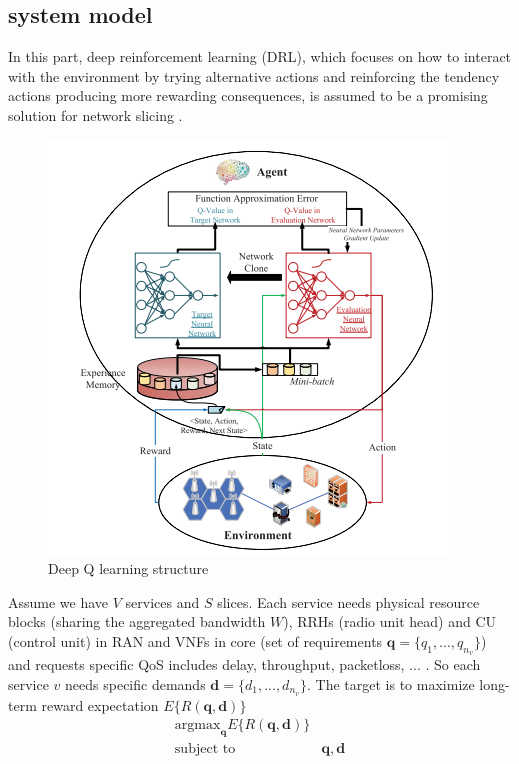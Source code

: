 \documentclass[conference]{IEEEtran}
\begin{document}
\subsection{system model}
In this part, deep reinforcement learning (DRL), which focuses on how to interact with the environment by
trying alternative actions and reinforcing the tendency actions producing more rewarding consequences,
is assumed to be a promising solution for network slicing \cite{drl}.
\begin{figure}%
  \centering
    \includegraphics[width=\linewidth]{drl}
  \caption{Deep Q learning structure}
  \label{fig:drl}
\end{figure}
Assume we have $V$ services and $S$ slices. Each service needs physical resource blocks (sharing the aggregated bandwidth $W$), RRHs (radio unit head) and CU (control unit) in RAN and VNFs in core (set of requirements $\mathbf{q} = \{q_1, ..., q_{n_v}\}$) and requests specific QoS includes delay, throughput, packetloss, ... . 
So each service $v$ needs specific demands $\mathbf{d} = \{d_1, ..., d_{n_v}\}$.
The target is to maximize long-term reward expectation $E\{R(\mathbf{q},\mathbf{d})\}$
\begin{subequations}
\begin{alignat}{4}
\text{argmax}_{\mathbf{q}} E\{R(\mathbf{q},\mathbf{d})\} \\
\text{subject to} \quad  & \mathbf{q} , \mathbf{d}  
\end{alignat}
\label{constraints1}
\end{subequations}
\end{document}
